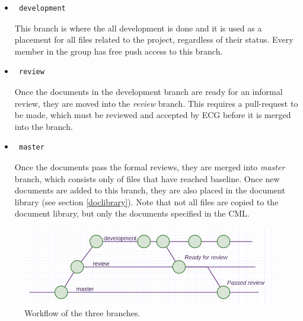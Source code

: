 \documentclass{article}
\begin{document}
            \begin{itemize}
                \item \begin{verbatim} development \end{verbatim}
                This branch is where the all development is done and it is used as a placement for all files related
                to the project, regardless of their status.
                Every member in the group has free push access to this branch.
                
                \item \begin{verbatim} review \end{verbatim}
                Once the documents in the development branch are ready for an informal review,  they are moved
                into the \textit{review} branch. This requires a pull-request to be made, which must be reviewed and accepted by ECG before it is merged into the branch. 
                
                \item \begin{verbatim} master \end{verbatim}
                Once the documents pass the formal reviews, they are merged into 
                \textit{master} branch, which consists only of files that have reached baseline.
                Once new documents are added to this branch, they are also placed in the document library (see section \ref{doclibrary}).
                Note that not all files are copied to the document library, but only the documents specified in the CML.
                
            \end{itemize}
            
            \begin{figure}[h]
                \centering
                \includegraphics[width=\textwidth]{images/workflow.png}
                \caption{Workflow of the three branches.}
                \label{workflow}
            \end{figure}
        
\end{document}
